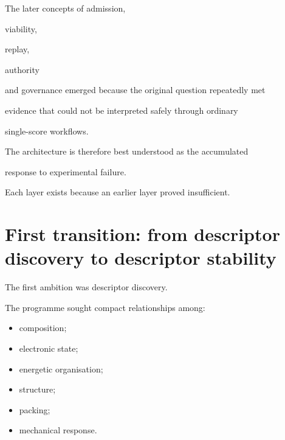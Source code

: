 \documentclass[11pt,a4paper,oneside]{report}
\begin{document}
The later concepts of admission,

viability,

replay,

authority

and governance emerged because the original question repeatedly met

evidence that could not be interpreted safely through ordinary

single-score workflows.



The architecture is therefore best understood as the accumulated

response to experimental failure.



Each layer exists because an earlier layer proved insufficient.





\section{First transition: from descriptor discovery to descriptor stability}



The first ambition was descriptor discovery.



The programme sought compact relationships among:



\begin{itemize}



\item

composition;



\item

electronic state;



\item

energetic organisation;



\item

structure;



\item

packing;



\item

mechanical response.



\end{itemize}
\end{document}
